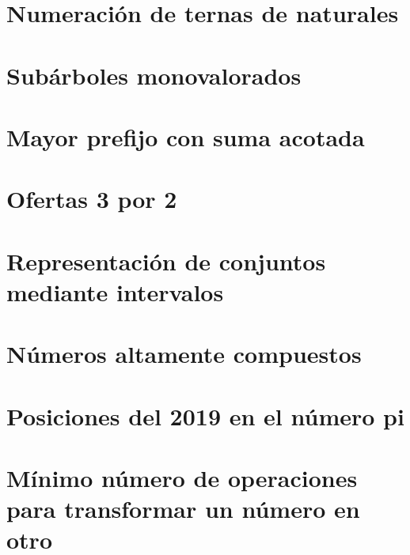 \documentclass[a4paper,12pt,twoside]{book}
\begin{document}
\chapter{Numeración de ternas de naturales}
\label{190109}

\chapter{Subárboles monovalorados}
\label{190110}

\chapter{Mayor prefijo con suma acotada}
\label{190111}


\chapter{Ofertas 3 por 2}
\label{190114}

\chapter{Representación de conjuntos mediante intervalos}
\label{190115}

\chapter{Números altamente compuestos}
\label{190116}

\chapter{Posiciones del 2019 en el número pi}
\label{190117}

\chapter{Mínimo número de operaciones para transformar
  un número en otro}
\label{190118}

\end{document}
